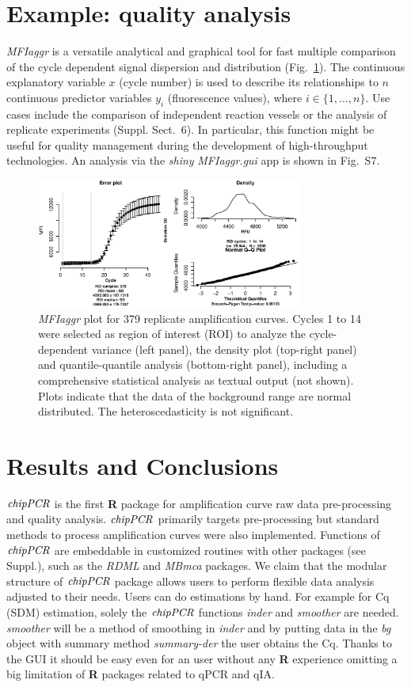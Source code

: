 \documentclass{bioinfo}
\begin{document}
\section{Example: quality analysis}

\textsl{MFIaggr} is a versatile analytical and graphical tool for fast multiple 
comparison of the cycle dependent signal dispersion and distribution 
(Fig.~\ref{fig:01}). The continuous explanatory variable $x$ (cycle number) is 
used to describe its relationships to $n$ continuous predictor variables $y_i$ 
(fluorescence values), where $i \in \{1, ..., n\}$. Use cases include the 
comparison of independent reaction vessels or the analysis of replicate 
experiments (Suppl. Sect.~6). In particular, this function might be useful for 
quality management during the development of high-throughput technologies. An 
analysis via the \emph{shiny} \textsl{MFIaggr.gui} app is shown in Fig.~S7.

\begin{figure}[!tpb]%
\centerline{\includegraphics[width=8.7cm]{fig01.eps}}
\caption{\textsl{MFIaggr} plot for 379 replicate amplification curves. Cycles 1 to 14 were 
selected as region of interest (ROI) to analyze the 
cycle-dependent variance (left panel), the density plot (top-right 
panel) and quantile-quantile analysis (bottom-right panel), including a 
comprehensive statistical analysis as textual output (not shown). Plots 
indicate that the data of the background range are normal 
distributed. The heteroscedasticity is not significant.}\label{fig:01}
\end{figure}
\section{Results and Conclusions}

$\emph{chipPCR}$ is the first \textbf{R} package for amplification curve raw 
data pre-processing and quality analysis. $\emph{chipPCR}$ primarily targets 
pre-processing but standard methods to process amplification curves were also 
implemented. Functions of $\emph{chipPCR}$ are embeddable in customized routines 
with other packages (see Suppl.), such as the \emph{RDML} and \emph{MBmca} 
packages. We claim that the 
modular structure of $\emph{chipPCR}$ package allows users to perform flexible 
data analysis adjusted to their needs. Users can do estimations by hand. For 
example for Cq (SDM) estimation, solely the $\emph{chipPCR}$ functions 
\textsl{inder} and \textsl{smoother} are needed. \textsl{smoother} will be a 
method of smoothing in \textsl{inder} and by putting data in the \textsl{bg} 
object with summary method \textsl{summary-der} the user obtains the Cq. Thanks 
to the GUI it should be easy even for an user without any \textbf{R} experience 
omitting a big limitation of \textbf{R} packages related to qPCR and qIA.
\end{document}
